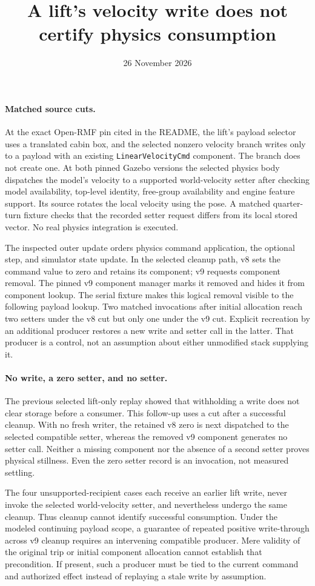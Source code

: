 \documentclass[11pt]{article}
\title{A lift's velocity write does not certify physics consumption}
\date{26 November 2026}
\begin{document}
\maketitle
\paragraph{Matched source cuts.}
At the exact Open-RMF pin cited in the README, the lift's payload
selector uses a translated cabin box, and the selected nonzero
velocity branch writes only to a payload with an existing
\texttt{LinearVelocityCmd} component. The branch does not create
one. At both pinned Gazebo versions the selected physics body
dispatches the model's velocity to a supported world-velocity
setter after checking model availability, top-level identity,
free-group availability and engine feature support. Its source
rotates the local velocity using the pose. A matched quarter-turn
fixture checks that the recorded setter request differs from its
local stored vector. No real physics integration is executed.

The inspected outer update orders physics command application,
the optional step, and simulator state update. In the selected
cleanup path, v8 sets the command value to zero and retains
its component; v9 requests component removal. The pinned v9
component manager marks it removed and hides it from component
lookup. The serial fixture makes this logical removal visible
to the following payload lookup. Two matched invocations after
initial allocation reach two setters under the v8 cut but only
one under the v9 cut. Explicit recreation by an additional
producer restores a new write and setter call in the latter.
That producer is a control, not an assumption about either
unmodified stack supplying it.

\paragraph{No write, a zero setter, and no setter.}
The previous selected lift-only replay showed that withholding
a write does not clear storage before a consumer. This follow-up
uses a cut after a successful cleanup. With no fresh writer,
the retained v8 zero is next dispatched to the selected
compatible setter, whereas the removed v9 component generates
no setter call. Neither a missing component nor the absence
of a second setter proves physical stillness. Even the zero
setter record is an invocation, not measured settling.

The four unsupported-recipient cases each receive an earlier
lift write, never invoke the selected world-velocity setter,
and nevertheless undergo the same cleanup. Thus cleanup
cannot identify successful consumption. Under the modeled
continuing payload scope, a guarantee of repeated positive
write-through across v9 cleanup requires an intervening
compatible producer. Mere validity of the original trip
or initial component allocation cannot establish that
precondition. If present, such a producer must be tied to the
current command and authorized effect instead of replaying a
stale write by assumption.
\end{document}
